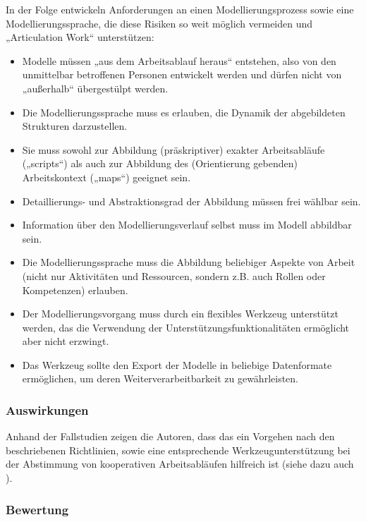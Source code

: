 \label{steps:herrmann} In der Folge entwickeln \citeauthor{Herrmann02} Anforderungen an einen Modellierungsprozess sowie eine Modellierungssprache, die diese Risiken so weit möglich vermeiden und „Articulation Work“ unterstützen:
\begin{itemize}
	\item Modelle müssen „aus dem Arbeitsablauf heraus“ entstehen, also von den unmittelbar betroffenen Personen entwickelt werden und dürfen nicht von „außerhalb“ übergestülpt werden.
	\item Die Modellierungssprache muss es erlauben, die Dynamik der abgebildeten Strukturen darzustellen.
	\item Sie muss sowohl zur Abbildung (präskriptiver) exakter Arbeitsabläufe („scripts“) als auch zur Abbildung des (Orientierung gebenden) Arbeitskontext („maps“) geeignet sein.
	\item Detaillierungs- und Abstraktionsgrad der Abbildung müssen frei wählbar sein.
	\item Information über den Modellierungsverlauf selbst muss im Modell abbildbar sein.
	\item Die Modellierungssprache muss die Abbildung beliebiger Aspekte von Arbeit (nicht nur Aktivitäten und Ressourcen, sondern z.B. auch Rollen oder Kompetenzen) erlauben.
	\item Der Modellierungsvorgang muss durch ein flexibles Werkzeug unterstützt werden, das die Verwendung der Unterstützungsfunktionalitäten ermöglicht aber nicht erzwingt.
	\item Das Werkzeug sollte den Export der Modelle in beliebige Datenformate ermöglichen, um deren Weiterverarbeitbarkeit zu gewährleisten.
\end{itemize}

\subsubsection{Auswirkungen}

Anhand der Fallstudien zeigen die Autoren, dass das ein Vorgehen nach den beschriebenen Richtlinien, sowie eine entsprechende Werkzeugunterstützung bei der Abstimmung von kooperativen Arbeitsabläufen hilfreich ist (siehe dazu auch \citep{Herrmann00}).

\subsubsection{Bewertung}

